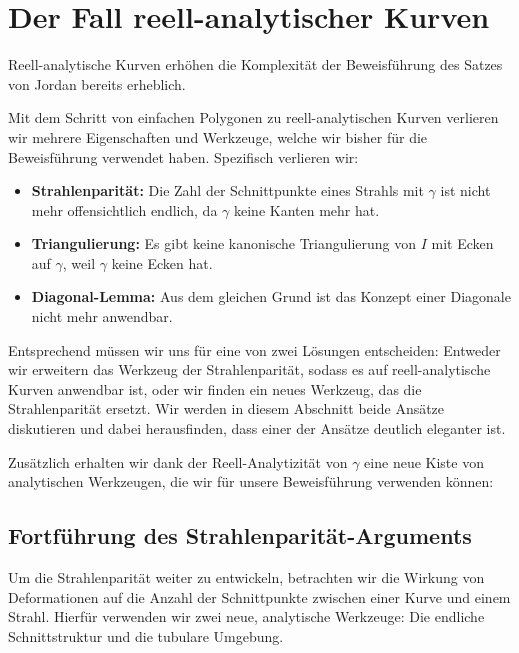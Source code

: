 %
%
%
%

\section{Der Fall reell-analytischer Kurven
\label{jordan:section:reell_analytische_kurven}}

Reell-analytische Kurven erhöhen die Komplexität der Beweisführung des Satzes von Jordan bereits erheblich.



Mit dem Schritt von einfachen Polygonen zu reell-analytischen Kurven verlieren wir mehrere Eigenschaften und Werkzeuge, welche wir bisher für die Beweisführung verwendet haben. 
Spezifisch verlieren wir:
\begin{itemize}
    \item \textbf{Strahlenparität:} Die Zahl der Schnittpunkte eines Strahls mit $\gamma$ ist nicht mehr offensichtlich endlich, da $\gamma$ keine Kanten mehr hat. 
    \item \textbf{Triangulierung:} Es gibt keine kanonische Triangulierung von $I$ mit Ecken auf $\gamma$, weil $\gamma$ keine Ecken hat. 
    \item \textbf{Diagonal-Lemma:} Aus dem gleichen Grund ist das Konzept einer Diagonale nicht mehr anwendbar.
\end{itemize}
Entsprechend müssen wir uns für eine von zwei Lösungen entscheiden: Entweder wir erweitern das Werkzeug der Strahlenparität, sodass es auf reell-analytische Kurven anwendbar ist, oder wir finden ein neues Werkzeug, das die Strahlenparität ersetzt. 
Wir werden in diesem Abschnitt beide Ansätze diskutieren und dabei herausfinden, dass einer der Ansätze deutlich eleganter ist. 

Zusätzlich erhalten wir dank der Reell-Analytizität von $\gamma$ eine neue Kiste von analytischen Werkzeugen, die wir für unsere Beweisführung verwenden können:

\subsection{Fortführung des Strahlenparität-Arguments}

Um die Strahlenparität weiter zu entwickeln, betrachten wir die Wirkung von Deformationen auf die Anzahl der Schnittpunkte zwischen einer Kurve und einem Strahl. 
Hierfür verwenden wir zwei neue, analytische Werkzeuge: Die endliche Schnittstruktur und die tubulare Umgebung. 

